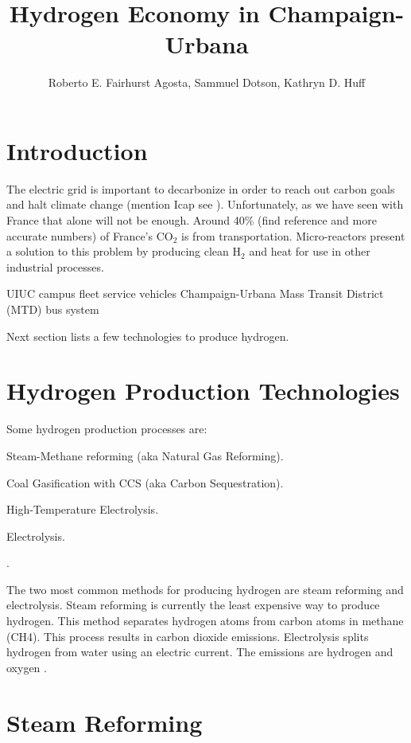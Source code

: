\documentclass{anstrans}
\title{Hydrogen Economy in Champaign-Urbana}
\author{Roberto E. Fairhurst Agosta, Sammuel Dotson, Kathryn D. Huff}
\institute{
University of Illinois at Urbana-Champaign, Dept. of Nuclear, Plasma, and Radiological Engineering\\
ref3@illinois.edu
}
\begin{document}
\section{Introduction}

The electric grid is important to decarbonize in order to reach out carbon goals and halt climate change
(mention Icap see \cite{holcomb_fueling_2015}).
Unfortunately, as we have seen with France that alone will not be enough. Around 40\% (find reference and more accurate numbers) of France's CO$_2$ is from transportation.
Micro-reactors present a solution to this problem by producing clean H$_2$ and heat for use in other industrial processes.

UIUC campus fleet service vehicles
Champaign-Urbana Mass Transit District (MTD) bus system


Next section lists a few technologies to produce hydrogen.

\section{Hydrogen Production Technologies}

Some hydrogen production processes are: 
\begin{description}[font=$\bullet$\scshape\bfseries]
	\item[] Steam-Methane reforming (aka Natural Gas Reforming).
	\item[] Coal Gasification with CCS (aka Carbon Sequestration).
	\item[] High-Temperature Electrolysis.
	\item[] Electrolysis.
	\item[] .
\end{description}

The two most common methods for producing hydrogen are steam reforming and electrolysis.
Steam reforming is currently the least expensive way to produce hydrogen. This method separates hydrogen atoms from carbon atoms in methane (CH4). This process results in carbon dioxide emissions.
Electrolysis splits hydrogen from water using an electric current. The emissions are hydrogen and oxygen \cite{noauthor_production_2019}. 

\section{Steam Reforming}
\end{document}

